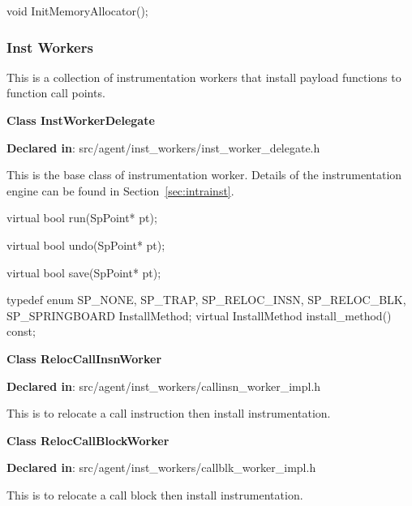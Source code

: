 \begin{apient}
void InitMemoryAllocator();
\end{apient}

\subsubsection{Inst Workers}

This is a collection of instrumentation workers that install payload functions
to function call points.

\textbf{Class InstWorkerDelegate}

\textbf{Declared in}: src/agent/inst\_workers/inst\_worker\_delegate.h

This is the base class of instrumentation worker. Details of the instrumentation
engine can be found in Section~\ref{sec:intrainst}.

\begin{apient}
virtual bool run(SpPoint* pt);
\end{apient}

\begin{apient}
virtual bool undo(SpPoint* pt);
\end{apient}

\begin{apient}
virtual bool save(SpPoint* pt);
\end{apient}

\begin{apient}
typedef enum {
  SP_NONE,
  SP_TRAP,      
  SP_RELOC_INSN,
  SP_RELOC_BLK, 
  SP_SPRINGBOARD
} InstallMethod;
virtual InstallMethod install_method() const;
\end{apient}

\textbf{Class RelocCallInsnWorker}

\textbf{Declared in}: src/agent/inst\_workers/callinsn\_worker\_impl.h

This is to relocate a call instruction then install instrumentation.

\textbf{Class RelocCallBlockWorker}

\textbf{Declared in}: src/agent/inst\_workers/callblk\_worker\_impl.h

This is to relocate a call block then install instrumentation.

